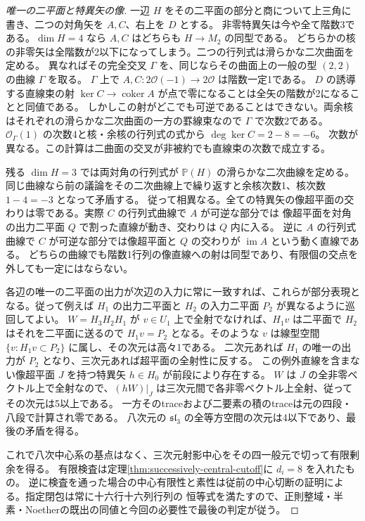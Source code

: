 \begin{proof}[唯一の二平面と特異矢の像]
一辺 $H$ をその二平面の部分と商について上三角に書き、二つの対角矢を $A,C$、右上を $D$ とする。
非零特異矢は今や全て階数3である。$\dim H=4$ なら $A,C$ はどちらも $H\to M_2$ の同型である。
どちらかの核の非零矢は全階数が2以下になってしまう。二つの行列式は滑らかな二次曲面を定める。
異なればその完全交叉 $\Gamma$ を、同じならその曲面上の一般の型 $(2,2)$ の曲線 $\Gamma$ を取る。
$\Gamma$ 上で $A,C:2\mathcal O(-1)\to2\mathcal O$ は階数一定1である。
$D$ の誘導する直線束の射 $\ker C\to\operatorname{coker} A$ が点で零になることは全矢の階数が2になることと同値である。
しかしこの射がどこでも可逆であることはできない。両余核はそれぞれの滑らかな二次曲面の一方の罫線束なので
$\Gamma$ で次数2である。$\mathcal O_\Gamma(1)$ の次数4と核・余核の行列式の式から $\deg\ker C=2-8=-6$。
次数が異なる。この計算は二曲面の交叉が非被約でも直線束の次数で成立する。

残る $\dim H=3$ では両対角の行列式が $\mathbb P(H)$ の滑らかな二次曲線を定める。
同じ曲線なら前の議論をその二次曲線上で繰り返すと余核次数1、核次数 $1-4=-3$ となって矛盾する。
従って相異なる。全ての特異矢の像超平面の交わりは零である。実際 $C$ の行列式曲線で $A$ が可逆な部分では
像超平面を対角の出力二平面 $Q$ で割った直線が動き、交わりは $Q$ 内に入る。
逆に $A$ の行列式曲線で $C$ が可逆な部分では像超平面と $Q$ の交わりが $\operatorname{im} A$ という動く直線である。
どちらの曲線でも階数1行列の像直線への射は同型であり、有限個の交点を外しても一定にはならない。

各辺の唯一の二平面の出力が次辺の入力に常に一致すれば、これらが部分表現となる。従って例えば
$H_1$ の出力二平面と $H_2$ の入力二平面 $P_2$ が異なるように巡回してよい。
$W=H_3H_2H_1$ が $v\in U_1$ 上で全射でなければ、$H_1v$ は二平面で $H_2$ はそれを二平面に送るので
$H_1v=P_2$ となる。そのような $v$ は線型空間 $\{v:H_1v\subset P_2\}$ に属し、その次元は高々1である。
二次元あれば $H_1$ の唯一の出力が $P_2$ となり、三次元あれば超平面の全射性に反する。
この例外直線を含まない像超平面 $J$ を持つ特異矢 $h\in H_0$ が前段により存在する。
$W$ は $J$ の全非零ベクトル上で全射なので、$(hW)|_J$ は三次元間で各非零ベクトル上全射、従ってその次元は5以上である。
一方そのtraceおよび二要素の積のtraceは元の四段・八段で計算され零である。
八次元の $\mathfrak{sl}_3$ の全等方空間の次元は4以下であり、最後の矛盾を得る。

これで八次中心系の基点はなく、三次元射影中心をその四一般元で切って有限剰余を得る。
有限検査は定理\ref{thm:successively-central-cutoff}に $d_i=8$ を入れたもの。
逆に検査を通った場合の中心有限性と素性は従前の中心切断の証明による。指定閉包は常に十六行十六列行列の
恒等式を満たすので、正則整域・半素・Noetherの既出の同値と今回の必要性で最後の判定が従う。
\end{proof}
